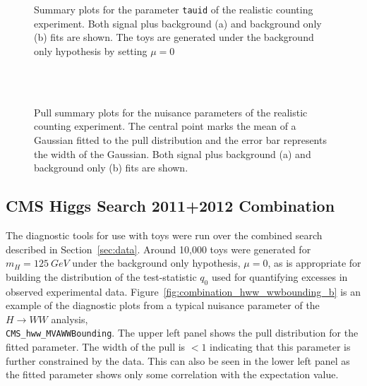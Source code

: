 \begin{figure*}[hbtp]
  \begin{center}
    \\
    \\
    \caption{Summary plots for the parameter \texttt{tauid} of the realistic counting experiment. Both signal plus background (a) and 
background only (b) fits are shown. The toys are generated under the background only hypothesis by setting $\mu=0$}
  \end{center}
\end{figure*}

\begin{figure*}[hbtp]
  \begin{center}
    \\
    \\
    \caption{Pull summary plots for the nuisance parameters of the realistic counting experiment. The central point marks the mean of a Gaussian fitted to 
the pull distribution and the error bar represents the width of the Gaussian. Both signal plus background (a) and background only (b) fits are shown.}
  \end{center}
\end{figure*}

\subsection{CMS Higgs Search 2011+2012 Combination}

The diagnostic tools for use with toys were run over the combined search described in Section~\ref{sec:data}.
Around 10,000 toys were generated for $m_{H}=125~GeV$ under the background only hypothesis, $\mu=0$, as is appropriate for 
building the distribution of the test-statistic $q_{0}$ used for quantifying excesses in observed experimental data. Figure~\ref{fig:combination_hww_wwbounding_b} is an example of the diagnostic plots from a typical nuisance parameter 
of the $H\rightarrow WW$ analysis,\\ 
\texttt{CMS\_hww\_MVAWWBounding}. The upper left panel shows the pull distribution for the fitted parameter. The width of
the pull is $<1$ indicating that this parameter is further constrained by the data. This can
also be seen in the lower left panel as the fitted parameter shows only some correlation with the expectation value. 

